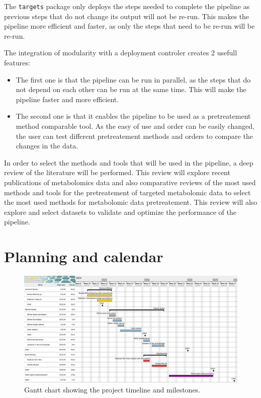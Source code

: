 \documentclass[ENG, BIB]{TFUOC}%
\begin{document}
The \texttt{targets} package only deploys the steps needed to complete the pipeline as previous steps that do not change its output will not be re-run. This makes the pipeline more efficient and faster, as only the steps that need to be re-run will be re-run. 

The integration of modularity with a deployment controler creates 2 usefull features:

\begin{itemize}
    \item The first one is that the pipeline can be run in parallel, as the steps that do not depend on each other can be run at the same time. This will make the pipeline faster and more efficient.
    \item The second one is that it enables the pipeline to be used as a pretreatement method comparable tool. As the easy of use and order can be easily changed, the user can test different pretreatement methods and orders to compare the changes in the data.
\end{itemize}


In order to select the methods and tools that will be used in the pipeline, a deep review of the literature will be performed. This review will explore recent publications of metabolomics data and also comparative reviews of the most used methods and tools for the pretreatement of targeted metabolomic data to select the most used methods for metabolomic data pretreatement. This review will also explore and select datasets to validate and optimize the performance of the pipeline.







\section{Planning and calendar}

\begin{figure}[htbp]
    \centering
    \includegraphics[width=\textwidth]{Images/gantt.png}
    \caption{Gantt chart showing the project timeline and milestones.}
    \label{fig:gantt}
\end{figure}
\end{document}
